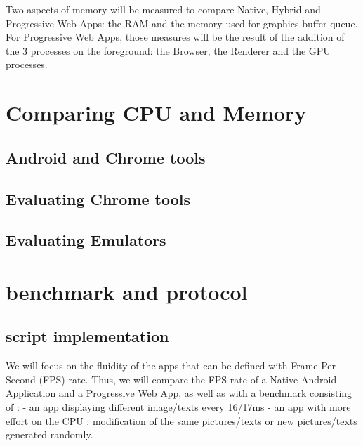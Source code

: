 Two aspects of memory will be measured to compare Native, Hybrid and Progressive Web Apps: the RAM and the memory used for graphics buffer queue. For Progressive Web Apps, those measures will be the result of the addition of the 3 processes on the foreground: the Browser, the Renderer and the GPU processes.

\fi
    
\section{Comparing CPU and Memory}
    \subsection{Android and Chrome tools}
    \subsection{Evaluating Chrome tools}
    \subsection{Evaluating Emulators}
\section{benchmark and protocol}

\subsection{script implementation}
\iffalse
We will focus on the fluidity of the apps that can be defined with Frame Per Second (FPS) rate.
Thus, we will compare the FPS rate of a Native Android Application and a Progressive Web App, as well as with a benchmark consisting of : 
    - an app displaying different image/texts every 16/17ms
    - an app with more effort on the CPU : modification of the same pictures/texts or new pictures/texts generated randomly.

